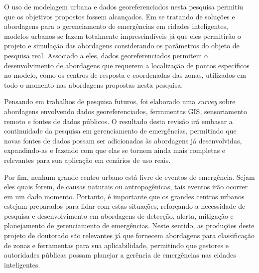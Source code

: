 O uso de modelagem urbana e dados georeferenciados nesta pesquisa permitiu que os objetivos propostos fossem alcançados. Em se tratando de soluções e abordagens para o gerenciamento de emergências em cidades inteligentes, modelos urbanos se fazem totalmente imprescindíveis já que eles permitirão o projeto e simulação das abordagens considerando os parâmetros do objeto de pesquisa real. Associado a eles, dados georeferenciados permitem o desenvolvimento de abordagens que requerem a localização de pontos específicos no modelo, como os centros de resposta e coordenadas das zonas, utilizados em todo o momento nas abordagens propostas nesta pesquisa.

Pensando em trabalhos de pesquisa futuros, foi elaborado uma \emph{survey} sobre abordagens envolvendo dados georeferenciados, ferramentas GIS, sensoriamento remoto e fontes de dados públicos. O resultado desta revisão irá embasar a continuidade da pesquisa em gerenciamento de emergências, permitindo que novas fontes de dados possam ser adicionadas às abordagens já desenvolvidas, expandindo-as e fazendo com que elas se tornem ainda mais completas e relevantes para sua aplicação em cenários de uso reais.

Por fim, nenhum grande centro urbano está livre de eventos de emergência. Sejam eles quais forem, de causas naturais ou antropogênicas, tais eventos irão ocorrer em um dado momento. Portanto, é importante que os grandes centros urbanos estejam preparados para lidar com estas situações, reforçando a necessidade de pesquisa e desenvolvimento em abordagens de detecção, alerta, mitigação e planejamento de gerenciamento de emergências. Neste sentido, as produções deste projeto de doutorado são relevantes já que fornecem abordagens para classificação de zonas e ferramentas para sua aplicabilidade, permitindo que gestores e autoridades públicas possam planejar a gerência de emergências nas cidades inteligentes.
